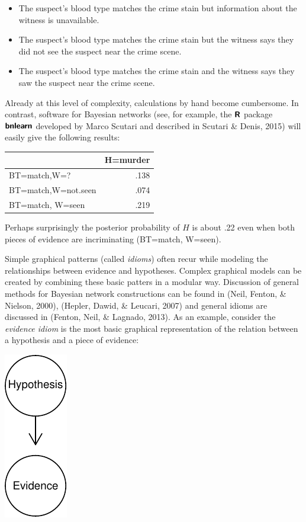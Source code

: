 \documentclass[11pt,dvipsnames,enabledeprecatedfontcommands]{scrartcl}
\begin{document}
\begin{itemize} 
\item The suspect's blood type matches the crime stain but  information about the witness is unavailable.
\item The suspect's blood type matches the crime stain but the witness says they did not see the suspect near the crime scene.
\item The suspect's blood type matches the crime stain and the witness says they saw the suspect near the crime scene.
\end{itemize}

\noindent Already at this level of complexity, calculations by hand
become cumbersome. In contrast, software for Bayesian networks (see, for
example, the \(\textbf{\textsf{R}}\) package
\(\textbf{\textsf{bnlearn}}\) developed by Marco Scutari and described
in Scutari \& Denis, 2015) will easily give the following results:

\begin{table}[H]
\centering
\begin{tabular}{lr}
\toprule
  & H=murder\\
\midrule
BT=match,W=? & .138\\
BT=match,W=not.seen & .074\\
BT=match, W=seen & .219\\
\bottomrule
\end{tabular}
\end{table}

\noindent
Perhaps surprisingly the posterior probability of \(H\) is about .22
even when both pieces of evidence are incriminating (BT=match, W=seen).

Simple graphical patterns (called \emph{idioms}) often recur while
modeling the relationships between evidence and hypotheses. Complex
graphical models can be created by combining these basic patters in a
modular way. Discussion of general methods for Bayesian network
constructions can be found in (Neil, Fenton, \& Nielson, 2000), (Hepler,
Dawid, \& Leucari, 2007) and general idioms are discussed in (Fenton,
Neil, \& Lagnado, 2013). As an example, consider the
\emph{evidence idiom} is the most basic graphical representation of the
relation between a hypothesis and a piece of evidence:

\begin{center}\includegraphics{BNfiles/unnamed-chunk-6-1} \end{center}
\end{document}
